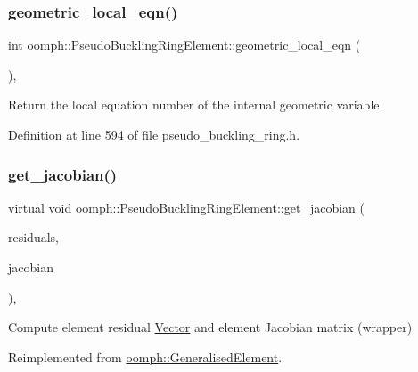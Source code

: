 \subsubsection{\texorpdfstring{geometric\+\_\+local\+\_\+eqn()}{geometric\_local\_eqn()}}
{\footnotesize\ttfamily int oomph\+::\+Pseudo\+Buckling\+Ring\+Element\+::geometric\+\_\+local\+\_\+eqn (\begin{DoxyParamCaption}{ }\end{DoxyParamCaption})\hspace{0.3cm}{\ttfamily [inline]}, {\ttfamily [private]}}



Return the local equation number of the internal geometric variable. 



Definition at line 594 of file pseudo\+\_\+buckling\+\_\+ring.\+h.

\mbox{\label{classoomph_1_1PseudoBucklingRingElement_afa1eca6b17521ac4e9ca4367a695f500}} 
\subsubsection{\texorpdfstring{get\+\_\+jacobian()}{get\_jacobian()}}
{\footnotesize\ttfamily virtual void oomph\+::\+Pseudo\+Buckling\+Ring\+Element\+::get\+\_\+jacobian (\begin{DoxyParamCaption}\item[{\hyperlink{classoomph_1_1Vector}{Vector}$<$ double $>$ \&}]{residuals,  }\item[{\hyperlink{classoomph_1_1DenseMatrix}{Dense\+Matrix}$<$ double $>$ \&}]{jacobian }\end{DoxyParamCaption})\hspace{0.3cm}{\ttfamily [inline]}, {\ttfamily [virtual]}}



Compute element residual \hyperlink{classoomph_1_1Vector}{Vector} and element Jacobian matrix (wrapper) 



Reimplemented from \hyperlink{classoomph_1_1GeneralisedElement_ab915bdad7e6643e5e73a6d98bc7cf48e}{oomph\+::\+Generalised\+Element}.



